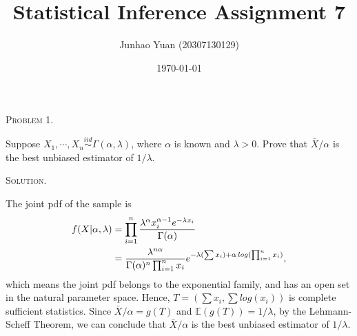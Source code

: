 \documentclass{article}
\title{\textbf{Statistical Inference Assignment 7}}
\author{Junhao Yuan (20307130129)}
\date{\today}
\begin{document}
\begin{CJK}{UTF8}{gbsn}

    \maketitle
    \def \RR{{\mathbb R}}
    \def \EE{{\mathbb E}}
    \def \VV{{\mathbb V}}
    \def \II{{\mathbb I}}
    \def \NN{{\mathcal N}}


    \begin{shaded}
        \noindent\textsc{Problem 1.}\par
        Suppose $X_1, \cdots, X_n \mathop{\sim}\limits^{iid} \Gamma(\alpha, \lambda)$, where $\alpha$ is known
        and $\lambda > 0$. Prove that $\bar{X}/\alpha$ is the best unbiased estimator of $1/\lambda$.
    \end{shaded}
    \noindent\textsc{Solution.}\par
    The joint pdf of the sample is
    \begin{align}
        f(X| \alpha, \lambda) & = \prod_{i=1}^n \frac{\lambda^{\alpha}x_i^{\alpha - 1}e^{-\lambda x_i}}{\Gamma(\alpha)} \notag                                  \\
                              & = \frac{\lambda^{n\alpha}}{\Gamma(\alpha)^n \prod_{i=1}^n x_i}e^{-\lambda (\sum x_i) + \alpha \,log(\prod_{i=1}^n x_i)}, \notag
    \end{align}
    which means the joint pdf belongs to the exponential family, and has an open set in the natural parameter space.
    Hence, $T=(\sum x_i, \sum log (x_i))$ is complete sufficient statistics.
    Since $\bar{X}/\alpha = g(T)$ and $\EE(g(T)) = 1/\lambda$, by the Lehmann-Scheff Theorem, we can conclude
    that $\bar{X}/\alpha$ is the best unbiased estimator of $1/\lambda$.






\end{CJK}
\end{document}
